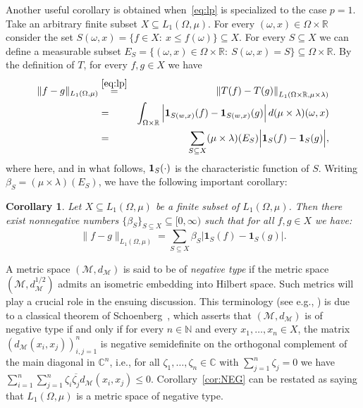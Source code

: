 \documentclass{icm2010}
\newtheorem{cor}[theorem]{Corollary}
\theoremstyle{definition}
\newcommand{\R}{\mathbb{R}}
\newcommand{\1}{\mathbf{1}}
\newcommand{\M}{\mathscr{M}}
\newcommand{\N}{\mathbb{N}}
\newcommand{\C}{\mathbb{C}}
\renewcommand{\le}{\leqslant}
\begin{document}
Another useful corollary is obtained when~\eqref{eq:lp} is
specialized to the case $p=1$. Take an arbitrary finite subset
$X\subseteq L_1(\Omega,\mu)$. For every $(\omega,x)\in \Omega\times
\R$ consider the set $S(\omega,x)= \{f\in X:\ x\le
f(\omega)\}\subseteq X$. For every $S\subseteq X$ we can define a
measurable subset $E_S= \{(\omega,x)\in \Omega\times \R:\
S(\omega,x)=S\}\subseteq \Omega\times \R$. By the definition of $T$,
for every $f,g\in X$ we have
\begin{eqnarray*}\label{proof:cut}
\|f-g\|_{L_1(\Omega,\mu)}&\stackrel{\eqref{eq:lp}}{=}
&\left\|T(f)-T(g)\right\|_{L_1(\Omega\times \R,\mu\times \lambda)}\nonumber
\\\nonumber&=&\int_{\Omega\times \R} \Big|\1_{S(w,x)}(f)-\1_{S(w,x)}(g)\Big|\,
d(\mu\times \lambda)(\omega,x)\\&=&\sum_{S\subseteq X} (\mu\times \lambda)(E_S)\Big|\1_{S}(f)-\1_{S}(g)\Big|,
\end{eqnarray*}
where here, and in what follows, ${\bf 1}_S(\cdot)$ is the
characteristic function of $S$. Writing %
$\beta_S=(\mu\times \lambda)(E_S)$, we have the following important
corollary:
\begin{cor}\label{cor:cut}
Let $X\subseteq L_1(\Omega,\mu)$ be a finite subset of $L_1(\Omega,\mu)$. Then there exist nonnegative numbers $\{\beta_S\}_{S\subseteq X}\subseteq [0,\infty)$ such that for all $f,g\in X$ we have:
\begin{equation}\label{eq:superposition}
\|f-g\|_{L_1(\Omega,\mu)}=\sum_{S\subseteq X} \beta_S\Big|\1_{S}(f)-\1_{S}(g)\Big|.
\end{equation}
\end{cor}

A metric space $(\M,d_\M)$ is said to be of {\em negative type} if
the metric space $\left(\M,d_\M^{1/2}\right)$ admits an isometric
embedding into Hilbert space. Such metrics will play a crucial role
in the ensuing discussion. This terminology (see e.g.,
\cite{dezalaur}) is due to a classical theorem of
Schoenberg~\cite{schoenberg}, which asserts that $(\M,d_\M)$ is of
negative type if and only if for every $n\in \N$ and every
$x_1,\ldots,x_n\in X$, the matrix $(d_\M(x_i,x_j))_{i,j=1}^n$ is
negative semidefinite on the orthogonal complement of the main
diagonal in $\C^n$, i.e., for all $\zeta_1,\ldots,\zeta_n\in \C$
with $\sum_{j=1}^n\zeta_j=0$ we have $\sum_{i=1}^n\sum_{j=1}^n
\zeta_i\overline{\zeta_j}d_\M(x_i,x_j)\le 0$.
Corollary~\eqref{cor:NEG} can be restated as saying that
$L_1(\Omega,\mu)$ is a metric space of negative type.
\end{document}
